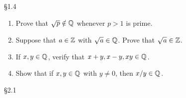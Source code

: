 \documentclass[11pt,fleqn,dvipsnames,usenames]{article}
\renewcommand{\headrulewidth}{1pt}
\begin{document}
\fancyhead[L]{\course}
\fancyhead[R]{\term}
\renewcommand{\headrulewidth}{0.4pt}

{\huge \S1.4}
\vsp

\begin{enumerate}
\item Prove that $\sqrt{p}\notin\mathbb{Q}$ whenever $p>1$ is prime.
\item Suppose that $a\in\mathbb{Z}$ with $\sqrt{a}\in \mathbb{Q}$.  Prove that $\sqrt{a}\in\mathbb{Z}$.
\item If $x,y\in\mathbb{Q}$, verify that $x+y, x-y, xy\in \mathbb{Q}$.
\item Show that if $x,y\in\mathbb{Q}$ with $y\neq 0$, then $x/y\in\mathbb{Q}$.
\end{enumerate}
\vsp

{\huge \S2.1}
\vsp
\end{document}
